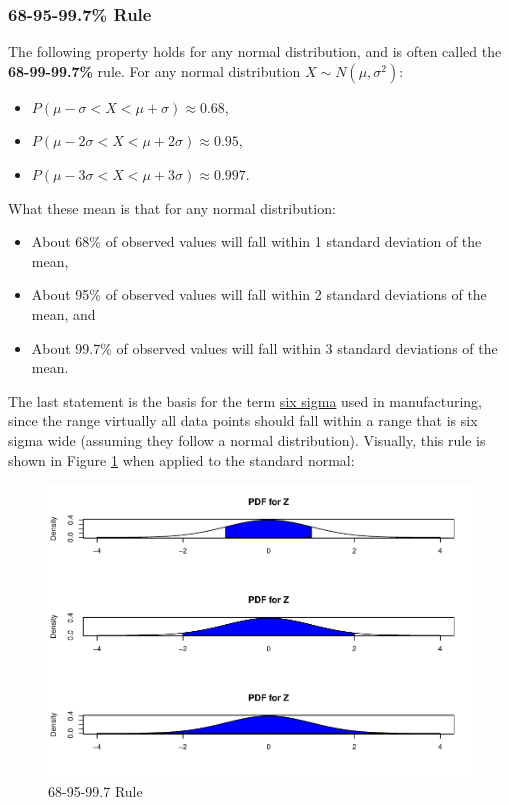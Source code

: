\documentclass[
]{book}
\providecommand{\tightlist}{%
  \setlength{\itemsep}{0pt}\setlength{\parskip}{0pt}}
\begin{document}
\subsubsection{68-95-99.7\% Rule}\label{rulenorm}

The following property holds for any normal distribution, and is often called the \textbf{68-99-99.7\%} rule. For any normal distribution \(X \sim N(\mu, \sigma^2)\):

\begin{itemize}
\tightlist
\item
  \(P(\mu - \sigma < X < \mu + \sigma) \approx 0.68\),
\item
  \(P(\mu - 2\sigma < X < \mu + 2\sigma) \approx 0.95\),
\item
  \(P(\mu - 3\sigma < X < \mu + 3\sigma) \approx 0.997\).
\end{itemize}

What these mean is that for any normal distribution:

\begin{itemize}
\tightlist
\item
  About 68\% of observed values will fall within 1 standard deviation of the mean,
\item
  About 95\% of observed values will fall within 2 standard deviations of the mean, and
\item
  About 99.7\% of observed values will fall within 3 standard deviations of the mean.
\end{itemize}

The last statement is the basis for the term \href{https://en.wikipedia.org/wiki/Six_Sigma}{six sigma} used in manufacturing, since the range virtually all data points should fall within a range that is six sigma wide (assuming they follow a normal distribution). Visually, this rule is shown in Figure \ref{fig:4-rule} when applied to the standard normal:

\begin{figure}
\centering
\includegraphics{bookdown-demo_files/figure-latex/4-rule-1.pdf}
\caption{\label{fig:4-rule}68-95-99.7 Rule}
\end{figure}
\end{document}
